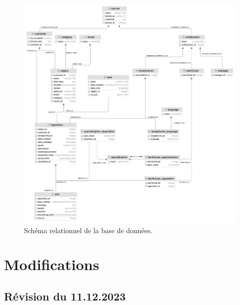 \documentclass{article}
\begin{document}
\begin{figure}[!htb]
        \centering
        \includegraphics[width=1\textwidth]{../assets/diagramme-relationnel.png}
        \caption{Schéma relationnel de la base de données.}
\end{figure}

\section{Modifications}

\subsection*{Révision du 11.12.2023}


\end{document}
